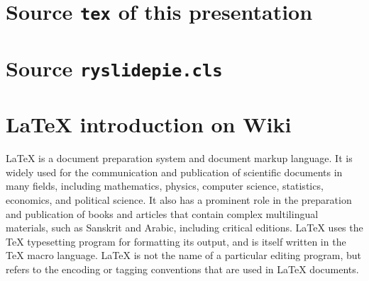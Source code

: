 \documentclass{ryslidepie}
\begin{document}
\newpage\section{Source {\tt tex} of this presentation}
\newpage\section{Source {\tt ryslidepie.cls}}
\newpage\section{\LaTeX{} introduction on Wiki}
\LaTeX{} is a document preparation system and document markup language.
It is widely used for the communication and publication of scientific documents in many fields,
including mathematics, physics, computer science, statistics, economics, and political science.
It also has a prominent role in the preparation and publication of books %
and articles that contain complex multilingual materials,
such as Sanskrit and Arabic, including critical editions.
\LaTeX{} uses the \TeX{} typesetting program for formatting its output,
and is itself written in the \TeX{} macro language.
\LaTeX{} is not the name of a particular editing program,
but refers to the encoding or tagging conventions that are used in \LaTeX{} documents.
\mybackcover
\end{document}
